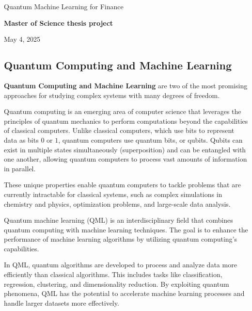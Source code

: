 \documentclass[%
oneside,                 %
final,                   %
10pt]{article}
\begin{document}
\thispagestyle{empty}

\begin{center}
{\LARGE\bf
\begin{spacing}{1.25}
Quantum Machine Learning for Finance
\end{spacing}
}
\end{center}

\begin{center}
{\bf Master of Science thesis project${}^{}$} \\ [0mm]
\end{center}

\begin{center}
\end{center}

\begin{center}
May 4, 2025
\end{center}

\vspace{1cm}


\subsection*{Quantum Computing and Machine Learning}

\textbf{Quantum Computing and Machine Learning} are two of the most promising
approaches for studying complex systems with many degrees of freedom.

Quantum computing is an emerging area of computer science that
leverages the principles of quantum mechanics to perform computations
beyond the capabilities of classical computers. Unlike classical
computers, which use bits to represent data as bits $0$ or $1$,
quantum computers use quantum bits, or qubits. Qubits can exist in
multiple states simultaneously (superposition) and can be entangled
with one another, allowing quantum computers to process vast amounts
of information in parallel.

These unique properties enable quantum computers to tackle problems
that are currently intractable for classical systems, such as complex
simulations in chemistry and physics, optimization problems, and
large-scale data analysis.

Quantum machine learning (QML) is an interdisciplinary field that
combines quantum computing with machine learning techniques. The goal
is to enhance the performance of machine learning algorithms by
utilizing quantum computing’s capabilities.

In QML, quantum algorithms are developed to process and analyze data
more efficiently than classical algorithms. This includes tasks like
classification, regression, clustering, and dimensionality
reduction. By exploiting quantum phenomena, QML has the potential to
accelerate machine learning processes and handle larger datasets more
effectively.
\end{document}
